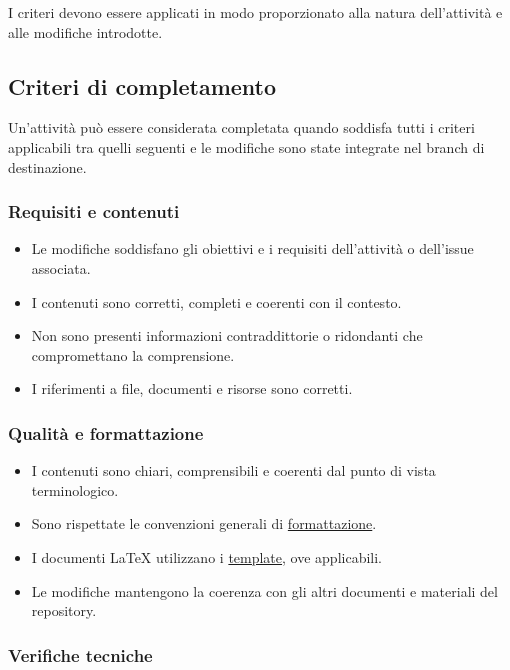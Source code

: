 \documentclass[11pt, a4paper]{article}
\begin{document}
\noindent I criteri devono essere applicati in modo proporzionato alla natura dell'attività e alle modifiche introdotte.

\subsection{Criteri di completamento}

Un'attività può essere considerata completata quando soddisfa tutti i criteri applicabili tra quelli seguenti e le modifiche sono state integrate nel branch di destinazione.

\subsubsection{Requisiti e contenuti}

\begin{itemize}
    \item Le modifiche soddisfano gli obiettivi e i requisiti dell'attività o dell'issue associata.
    \item I contenuti sono corretti, completi e coerenti con il contesto.
    \item Non sono presenti informazioni contraddittorie o ridondanti che compromettano la comprensione.
    \item I riferimenti a file, documenti e risorse sono corretti.
\end{itemize}

\subsubsection{Qualità e formattazione}

\begin{itemize}
    \item I contenuti sono chiari, comprensibili e coerenti dal punto di vista terminologico.
    \item Sono rispettate le convenzioni generali di \hyperref[subsec:formattazione-del-testo]{formattazione}.
    \item I documenti LaTeX utilizzano i \href{https://github.com/On-By-One-Team/On-By-One.github.io/tree/main/docs/tex/templates}{template}, ove applicabili.
    \item Le modifiche mantengono la coerenza con gli altri documenti e materiali del repository.
\end{itemize}

\subsubsection{Verifiche tecniche}
\end{document}
